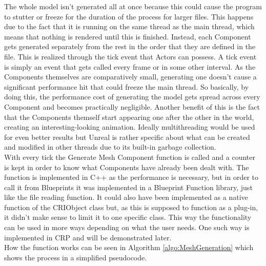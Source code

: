 The whole model isn't generated all at once because this could cause the program to stutter or freeze for the duration of the process for larger files. This happens due to the fact that it is running on the same thread as the main thread, which means that nothing is rendered until this is finished. Instead, each Component gets generated separately from the rest in the order that they are defined in the file. This is realized through the tick event that Actors can possess. A tick event is simply an event that gets called every frame or in some other interval. As the Components themselves are comparatively small, generating one doesn't cause a significant performance hit that could freeze the main thread. So basically, by doing this, the performance cost of generating the model gets spread across every Component and becomes practically negligible. Another benefit of this is the fact that the Components themself start appearing one after the other in the world, creating an interesting-looking animation. Ideally multithreading would be used for even better results but Unreal is rather specific about what can be created and modified in other threads due to its built-in garbage collection\cite{bib:MultiThread}.\\
With every tick the Generate Mesh Component function is called and a counter is kept in order to know what Components have already been dealt with. The function is implemented in C++ as the performance is necessary, but in order to call it from Blueprints it was implemented in a Blueprint Function library, just like the file reading function. It could also have been implemented as a native function of the CRIObject class but, as this is supposed to function as a plug-in, it didn't make sense to limit it to one specific class. This way the functionality can be used in more ways depending on what the user needs. One such way is implemented in \acs{CRP} and will be demonstrated later.\\
How the function works can be seen in Algorithm \ref{algo:MeshGeneration} which shows the process in a simplified pseudocode.

